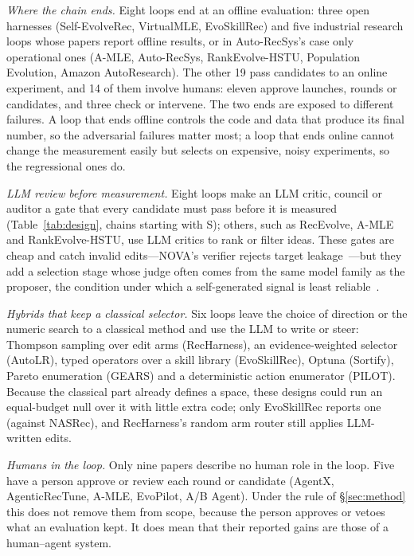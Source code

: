 \documentclass[sigconf,nonacm]{acmart}
\begin{document}
\emph{Where the chain ends.} Eight loops end at an offline evaluation: three open harnesses
(Self-EvolveRec, VirtualMLE, EvoSkillRec) and five industrial research loops whose papers report offline results, or in
Auto-RecSys's case only operational ones (A-MLE, Auto-RecSys, RankEvolve-HSTU, Population Evolution, Amazon
AutoResearch). The other 19 pass candidates to an online experiment, and 14 of them involve humans: eleven approve
launches, rounds or candidates, and three check or intervene. The two ends are exposed
to different failures. A loop that ends offline controls the code and data that produce its final number, so the
adversarial failures matter most; a loop that ends online cannot change the measurement easily but selects on
expensive, noisy experiments, so the regressional ones do.

\emph{LLM review before measurement.} Eight loops make an LLM critic, council or auditor a gate that every
candidate must pass before it is measured (Table~\ref{tab:design}, chains starting with S); others, such as RecEvolve,
A-MLE and RankEvolve-HSTU, use LLM critics to rank or filter ideas. These gates are cheap and catch invalid edits---NOVA's
verifier rejects target leakage~\cite{liu2026nova}---but they add a selection stage whose judge often comes from the
same model family as the proposer, the condition under which a self-generated signal is least
reliable~\cite{gao2023overoptimization,yang2026ideationgoodhart}.

\emph{Hybrids that keep a classical selector.} Six loops leave the choice of direction or the numeric search to a
classical method and use the LLM to write or steer: Thompson sampling over edit arms (RecHarness), an evidence-weighted
selector (AutoLR), typed operators over a skill library (EvoSkillRec), Optuna (Sortify), Pareto enumeration (GEARS) and
a deterministic action enumerator (PILOT). Because the classical part already defines a space, these designs could
run an equal-budget null over it with little extra code; only EvoSkillRec reports one (against NASRec), and RecHarness's
random arm router still applies LLM-written edits.

\emph{Humans in the loop.} Only nine papers describe no human role in the loop. Five have a person approve or review each
round or candidate (AgentX, AgenticRecTune, A-MLE, EvoPilot, A/B Agent). Under the rule of \S\ref{sec:method} this does not remove
them from scope, because the person approves or vetoes what an evaluation kept. It does mean that their reported gains are those of a human--agent
system.
\end{document}
